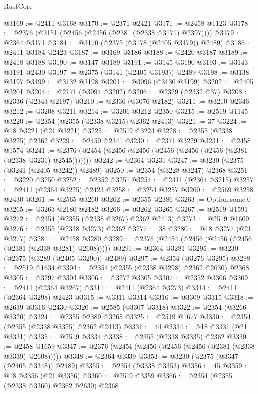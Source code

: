 \begin{lexlean}{RustCore}
\begin{coremodule}
@3169 := @2411 @3168
@3170 := @2371 @2421
@3171 := @2458 @1123
@3178 := @2376 (@3151 (@2456 (@2456 (@2381 (@2338 @3171) @2397))))
@3179 := @2364 @3171
@3184 := @3170 (@2375 (@3178 (@2405 @3179)) @2489)
@3186 := @2411 @3184 @2423
@3187 := @3169 @3186
@3188 := @2420 @3187
@3189 := @2418 @3188
@3190 := @3147 @3189
@3191 := @3145 @3190
@3193 := @3143 @3191 @2430
@3197 := @2375 (@3141 (@2405 @3193)) @2489
@3198 := @3138 @3197
@3199 := @3132 @3198
@3201 := @3096 (@3130 @3199)
@3202 := @2405 @3201
@3204 := @2171 (@3094 @3202)
@3206 := @2329 (@2332 @37)
@3208 := @2336 (@2343 @2197)
@3210 := @2336 (@3076 @2182)
@3211 := @3210 @2346
@3212 := @3208 @3211
@3214 := @3206 @3212 @2350
@3215 := @2519 @1145
@3220 := @2354 (@2355 (@2338 @3215) @2362 @2413)
@3221 := 37
@3224 := @18 @3221 (@21 @3221)
@3225 := @2519 @3224
@3228 := @2355 (@2338 @3225) @2362
@3229 := @2450 @2341
@3230 := @2371 @3229
@3231 := @2458 @1574
@3241 := @2376 (@2454 (@2456 (@2456 (@2456 (@2456 (@2456 (@2381 (@2338 @3231) @2545)))))))
@3242 := @2364 @3231
@3247 := @3230 (@2375 (@3241 (@2405 @3242)) @2489)
@3250 := @2354 (@3228 @3247) @2368
@3251 := @3220 @3250
@3252 := @2352 @3251
@3254 := @2411 (@2364 @3215)
@3257 := @2411 (@2364 @3225) @2423
@3258 := @3254 @3257
@3260 := @2569 @3258 @2430
@3261 := @2565 @3260
@3262 := @2355 @2386
@3263 := Option.some.{0}
@3265 := @3263 @2180 @2182
@3266 := @3262 @3265
@3267 := @2519 @1591
@3272 := @2354 (@2355 (@2338 @3267) @2362 @2413)
@3273 := @2519 @1609
@3276 := @2355 (@2338 @3273) @2362
@3277 := 38
@3280 := @18 @3277 (@21 @3277)
@3281 := @2458 @3280
@3289 := @2376 (@2454 (@2456 (@2456 (@2456 (@2381 (@2338 @3281) @2608)))))
@3290 := @2364 @3281
@3295 := @3230 (@2375 (@3289 (@2405 @3290)) @2489)
@3297 := @2354 (@3276 @3295)
@3298 := @2519 @1634
@3304 := @2354 (@2355 (@2338 @3298) @2362 @2630) @2368
@3305 := @3297 @3304
@3306 := @3272 @3305
@3307 := @2352 @3306
@3309 := @2411 (@2364 @3267)
@3311 := @2411 (@2364 @3273)
@3314 := @2411 (@2364 @3298) @2423
@3315 := @3311 @3314
@3316 := @3309 @3315
@3318 := @2639 @3316 @2430
@3320 := @2585 (@3307 @3318)
@3322 := @2354 (@3266 @3320)
@3324 := @2355 @2389 @3265
@3325 := @2519 @1677
@3330 := @2354 (@2355 (@2338 @3325) @2362 @2413)
@3331 := 44
@3334 := @18 @3331 (@21 @3331)
@3335 := @2519 @3334
@3338 := @2355 (@2338 @3335) @2362
@3339 := @2458 @1659
@3347 := @2376 (@2454 (@2456 (@2456 (@2456 (@2381 (@2338 @3339) @2608)))))
@3348 := @2364 @3339
@3353 := @3230 (@2375 (@3347 (@2405 @3348)) @2489)
@3355 := @2354 (@3338 @3353)
@3356 := 45
@3359 := @18 @3356 (@21 @3356)
@3360 := @2519 @3359
@3366 := @2354 (@2355 (@2338 @3360) @2362 @2630) @2368

\end{coremodule}
\end{lexlean}
